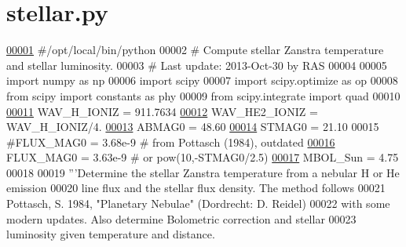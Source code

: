 \hypertarget{stellar_8py_source}{}\section{stellar.\+py}
\label{stellar_8py_source}

\begin{DoxyCode}
\hypertarget{stellar_8py_source_l00001}{}\hyperlink{namespacepyneb_1_1utils_1_1stellar}{00001} \textcolor{comment}{#/opt/local/bin/python}
00002 \textcolor{comment}{# Compute stellar Zanstra temperature and stellar luminosity.}
00003 \textcolor{comment}{# Last update: 2013-Oct-30 by RAS}
00004 
00005 \textcolor{keyword}{import} numpy \textcolor{keyword}{as} np
00006 \textcolor{keyword}{import} scipy
00007 \textcolor{keyword}{import} scipy.optimize \textcolor{keyword}{as} op
00008 \textcolor{keyword}{from} scipy \textcolor{keyword}{import} constants \textcolor{keyword}{as} phy
00009 \textcolor{keyword}{from} scipy.integrate \textcolor{keyword}{import} quad
00010 
\hypertarget{stellar_8py_source_l00011}{}\hyperlink{namespacepyneb_1_1utils_1_1stellar_afb8d2a4b14477b7097da285535eafc12}{00011} WAV\_H\_IONIZ   = 911.7634
\hypertarget{stellar_8py_source_l00012}{}\hyperlink{namespacepyneb_1_1utils_1_1stellar_a1b0844f39c08a2b7289ad093042cf55e}{00012} WAV\_HE2\_IONIZ = WAV\_H\_IONIZ/4.
\hypertarget{stellar_8py_source_l00013}{}\hyperlink{namespacepyneb_1_1utils_1_1stellar_a54ebf26e2af1a957afac5ce6db64de30}{00013} ABMAG0     = 48.60
\hypertarget{stellar_8py_source_l00014}{}\hyperlink{namespacepyneb_1_1utils_1_1stellar_a53dc996c80c0bc5ee416b1fcbb8a6afc}{00014} STMAG0     = 21.10
00015 \textcolor{comment}{#FLUX\_MAG0 = 3.68e-9    # from Pottasch (1984), outdated}
\hypertarget{stellar_8py_source_l00016}{}\hyperlink{namespacepyneb_1_1utils_1_1stellar_ab52d6f24f3c66cb2d6ad7e52bd4b4cd6}{00016} FLUX\_MAG0  = 3.63e-9    \textcolor{comment}{# or pow(10,-STMAG0/2.5)}
\hypertarget{stellar_8py_source_l00017}{}\hyperlink{namespacepyneb_1_1utils_1_1stellar_ab677115958b6555a42963ed87adc1afc}{00017} MBOL\_Sun   = 4.75
00018 
00019 \textcolor{stringliteral}{'''Determine the stellar Zanstra temperature from a nebular H or He emission }
00020 \textcolor{stringliteral}{   line flux and the stellar flux density. The method follows }
00021 \textcolor{stringliteral}{       Pottasch, S. 1984, "Planetary Nebulae" (Dordrecht: D. Reidel)}
00022 \textcolor{stringliteral}{   with some modern updates. Also determine Bolometric correction and stellar }
00023 \textcolor{stringliteral}{   luminosity given temperature and distance. }

\end{DoxyCode}
